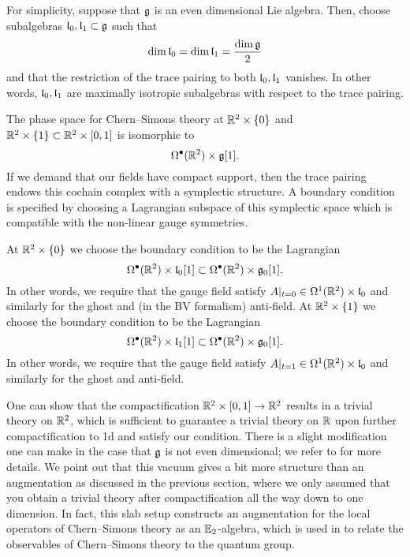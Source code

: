 \documentclass[11pt]{amsart}
\begin{document}
For simplicity, suppose that $\mathfrak g$ is an even dimensional Lie algebra. 
Then, choose subalgebras $\mathfrak{l}_0, \mathfrak{l}_1 \subset \mathfrak g$ such that 
\[
\dim \mathfrak{l}_0 = \dim \mathfrak{l}_1 = \frac{\dim \mathfrak g}{2} 
\]
and that the restriction of the trace pairing to both $\mathfrak{l}_0,\mathfrak{l}_1$ vanishes. 
In other words, $\mathfrak{l}_0, \mathfrak{l}_1$ are maximally isotropic subalgebras with respect to the trace pairing. 

The phase space for Chern--Simons theory at $\mathbb R^2 \times \{0\}$ and $\mathbb R^2 \times \{1\} \subset \mathbb R^2 \times [0,1]$ is isomorphic to 
\[
\Omega^\bullet(\mathbb R^2) \times \mathfrak g[1] .
\]
If we demand that our fields have compact support, then the trace pairing endows this cochain complex with a symplectic structure. 
A boundary condition is specified by choosing a Lagrangian subspace of this symplectic space which is compatible with the non-linear gauge symmetries. 

At $\mathbb R^2 \times \{0\}$ we choose the boundary condition to be the Lagrangian
\[
\Omega^\bullet(\mathbb R^2) \times \mathfrak{l}_0 [1] \subset \Omega^\bullet(\mathbb R^2) \times \mathfrak{g}_0 [1]  .
\]
In other words, we require that the gauge field satisfy $A|_{t=0} \in \Omega^1 (\mathbb R^2) \times \mathfrak{l}_0$ and similarly for the ghost and (in the BV formalism) anti-field. 
At $\mathbb R^2 \times \{1\}$ we choose the boundary condition to be the Lagrangian
\[
\Omega^\bullet(\mathbb R^2) \times \mathfrak{l}_1 [1] \subset \Omega^\bullet(\mathbb R^2) \times \mathfrak{g}_0 [1]  .
\]
In other words, we require that the gauge field satisfy $A|_{t=1} \in \Omega^1 (\mathbb R^2) \times \mathfrak{l}_0$ and similarly for the ghost and anti-field. 

One can show that the compactification $\mathbb R^2 \times [0,1] \to \mathbb R^2$ results in a trivial theory on $\mathbb R^2$, which is sufficient to guarantee a trivial theory on $\mathbb R$ upon further compactification to 1d and satisfy our condition. 
There is a slight modification one can make in the case that $\mathfrak g$ is not even dimensional; we refer to \cite{Aamand} for more details. 
We point out that this vacuum gives a bit more structure than an augmentation as discussed in the previous section, where we only assumed that you obtain a trivial theory after compactification all the way down to one dimension. In fact, this slab setup constructs an augmentation for the local operators of Chern--Simons theory as an $\mathbb E_2$-algebra, which  is used in \cite{Aamand} to relate the observables of Chern--Simons theory to the quantum group.
\end{document}

